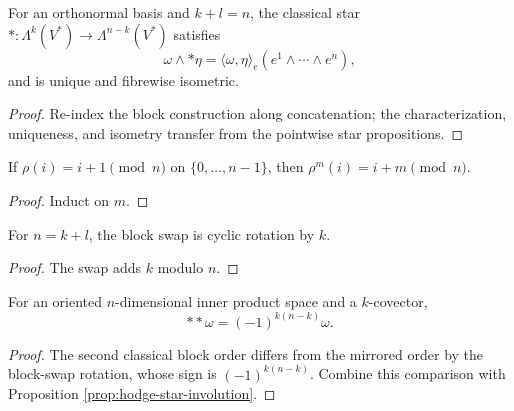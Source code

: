 \begin{proposition}
\label{prop:hodge-star-graded}
\leanok
{}
For an orthonormal basis and $k+l=n$, the classical star $*:\Lambda^k(V^*)\to\Lambda^{n-k}(V^*)$ satisfies
\[
\omega\wedge {*}\eta=\langle\omega,\eta\rangle_e(e^1\wedge\cdots\wedge e^n),
\]
and is unique and fibrewise isometric.
\end{proposition}
\begin{proof}
\leanok
\sketch Re-index the block construction along concatenation; the characterization, uniqueness, and isometry transfer from the pointwise star propositions.
\end{proof}

\begin{lemma}
\label{lem:finrotate-pow-val}
\leanok
If $\rho(i)=i+1\pmod n$ on $\{0,\ldots,n-1\}$, then $\rho^m(i)=i+m\pmod n$.
\end{lemma}
\begin{proof}
\leanok
\sketch Induct on $m$.
\end{proof}

\begin{lemma}
\label{lem:blockswap-eq-rotate}
\leanok
{}
For $n=k+l$, the block swap is cyclic rotation by $k$.
\end{lemma}
\begin{proof}
\leanok
\sketch The swap adds $k$ modulo $n$.
\end{proof}

\begin{proposition}
\label{prop:hodge-star-classical-involution}
\leanok
{}
For an oriented $n$-dimensional inner product space and a $k$-covector,
\[
{*}{*}\omega=(-1)^{k(n-k)}\omega.
\]
\end{proposition}
\begin{proof}
\leanok
\sketch The second classical block order differs from the mirrored order by the block-swap rotation, whose sign is $(-1)^{k(n-k)}$. Combine this comparison with Proposition \ref{prop:hodge-star-involution}.
\end{proof}

